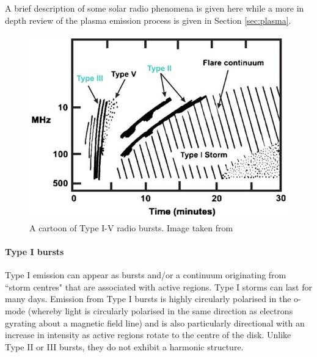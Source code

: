 A brief description of some solar radio phenomena is given here while a more in depth review of the plasma emission process is given in Section \ref{sec:plasma}.
\begin{figure}
    \centering
    \includegraphics[width=0.75\columnwidth]{Images/Burst_cartoon.jpg}
    \caption[Cartoon of Type I-V radio bursts.]{A cartoon of Type I-V radio bursts. Image taken from \cite{Cliver2009}}
    \label{fig:burst_cartoon}
\end{figure}
\paragraph{Type I bursts}
Type I emission can appear as bursts and/or a continuum originating from ``storm centres" that are associated with active regions. Type I storms can last for many days. Emission from Type I bursts is highly circularly polarised in the o-mode (whereby light is circularly polarised in the same direction as electrons gyrating about a magnetic field line) and is also particularly directional with an increase in intensity as active regions rotate to the centre of the disk. Unlike Type II or III bursts, they do not exhibit a harmonic structure.
